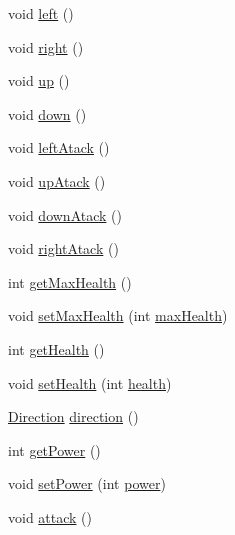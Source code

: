 \begin{DoxyCompactItemize}
\item 
void \mbox{\hyperlink{classentities_1_1_subject_a79b849ac8ec3b04db878e9a15f43284b}{left}} ()
\item 
void \mbox{\hyperlink{classentities_1_1_subject_a6a1ee4276efe4d5cc885288de3a812b0}{right}} ()
\item 
void \mbox{\hyperlink{classentities_1_1_subject_a48b885eabce7dd717959986004da6fd8}{up}} ()
\item 
void \mbox{\hyperlink{classentities_1_1_subject_acf3cbe158b93cc059365ae49dec13572}{down}} ()
\item 
void \mbox{\hyperlink{classentities_1_1_subject_a05131d10bde51bdd1f839559d321223f}{left\+Atack}} ()
\item 
void \mbox{\hyperlink{classentities_1_1_subject_ad1b2972826fd7c76750994c8b4d2b87b}{up\+Atack}} ()
\item 
void \mbox{\hyperlink{classentities_1_1_subject_ad6e17bb9c3f58a5052f553ef5a64f931}{down\+Atack}} ()
\item 
void \mbox{\hyperlink{classentities_1_1_subject_a6dcac47e937685e8021165e08289784a}{right\+Atack}} ()
\item 
int \mbox{\hyperlink{classentities_1_1_subject_ac44c73e2af436dff03d938fac9bfcd19}{get\+Max\+Health}} ()
\item 
void \mbox{\hyperlink{classentities_1_1_subject_a4bf16d3a7276dbd7c5ad2fbb22e7a125}{set\+Max\+Health}} (int \mbox{\hyperlink{classentities_1_1_subject_a72343827eacb9cf3a8807c0b0d1a4ace}{max\+Health}})
\item 
int \mbox{\hyperlink{classentities_1_1_subject_a5876631b4eb906fe9e1b51dd94a849e4}{get\+Health}} ()
\item 
void \mbox{\hyperlink{classentities_1_1_subject_ac5ff99e7167f6b979e9d63cedbc8c9ba}{set\+Health}} (int \mbox{\hyperlink{classentities_1_1_subject_a8285660fdae3f0b220bbc686cf5c012c}{health}})
\item 
\mbox{\hyperlink{enumentities_1_1_direction}{Direction}} \mbox{\hyperlink{classentities_1_1_subject_aba8c53089bb93c35ce8359d97cf99bd6}{direction}} ()
\item 
int \mbox{\hyperlink{classentities_1_1_subject_ad1d7f66f69c28fc91185c1996689b275}{get\+Power}} ()
\item 
void \mbox{\hyperlink{classentities_1_1_subject_a5f56d102b27182353d53e68d7459273a}{set\+Power}} (int \mbox{\hyperlink{classentities_1_1_subject_a7bd41d6fe9656de66d4a08c4a9565ec4}{power}})
\item 
void \mbox{\hyperlink{classentities_1_1_subject_a97663ba9e9a8708bf9affe4d9bf8de65}{attack}} ()

\end{DoxyCompactItemize}
